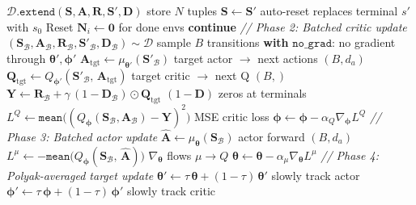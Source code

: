 \documentclass[11pt]{article}
\begin{document}
\begin{algorithm}[p]
\begin{minipage}[t]{0.68\linewidth}
\begin{algorithmic}[1]
    \State $\mathcal{D}.\texttt{extend}(\mathbf{S}, \mathbf{A}, \mathbf{R}, \mathbf{S}', \mathbf{D})$ \hfill store $N$ tuples
    \State $\mathbf{S} \gets \mathbf{S}'$ \hfill auto-reset replaces terminal $s'$ with $s_0$
    \State Reset $\mathbf{N}_i \gets \mathbf{0}$ for done envs
     \textbf{continue} \EndIf
    \Statex \hspace{\algorithmicindent}\textit{// Phase 2: Batched critic update}
    \State $(\mathbf{S}_\mathcal{B}, \mathbf{A}_\mathcal{B}, \mathbf{R}_\mathcal{B}, \mathbf{S}'_\mathcal{B}, \mathbf{D}_\mathcal{B}) \sim \mathcal{D}$ \hfill sample $B$ transitions
    \State \textbf{with} $\texttt{no\_grad}$: \hfill no gradient through $\boldsymbol{\theta}', \boldsymbol{\phi}'$
    \State \hspace{\algorithmicindent} $\mathbf{A}_{\text{tgt}} \gets \mu_{\boldsymbol{\theta}'}(\mathbf{S}'_\mathcal{B})$ \hfill target actor $\to$ next actions $(B, d_a)$
    \State \hspace{\algorithmicindent} $\mathbf{Q}_{\text{tgt}} \gets Q_{\boldsymbol{\phi}'}(\mathbf{S}'_\mathcal{B},\, \mathbf{A}_{\text{tgt}})$ \hfill target critic $\to$ next Q $(B,)$
    \State \hspace{\algorithmicindent} $\mathbf{Y} \gets \mathbf{R}_\mathcal{B} + \gamma\,(1 {-} \mathbf{D}_\mathcal{B}) \odot \mathbf{Q}_{\text{tgt}}$ \hfill $(1{-}\mathbf{D})$ zeros at terminals
    \State $L^Q \gets \texttt{mean}\!\big((Q_{\boldsymbol{\phi}}(\mathbf{S}_\mathcal{B}, \mathbf{A}_\mathcal{B}) - \mathbf{Y})^2\big)$ \hfill MSE critic loss
    \State $\boldsymbol{\phi} \gets \boldsymbol{\phi} - \alpha_Q \nabla_{\boldsymbol{\phi}} L^Q$
    \Statex \hspace{\algorithmicindent}\textit{// Phase 3: Batched actor update}
    \State $\hat{\mathbf{A}} \gets \mu_{\boldsymbol{\theta}}(\mathbf{S}_\mathcal{B})$ \hfill actor forward $(B, d_a)$
    \State $L^\mu \gets -\texttt{mean}\!\big(Q_{\boldsymbol{\phi}}(\mathbf{S}_\mathcal{B},\, \hat{\mathbf{A}})\big)$ \hfill $\nabla_{\boldsymbol{\theta}}$ flows $\mu \to Q$
    \State $\boldsymbol{\theta} \gets \boldsymbol{\theta} - \alpha_\mu \nabla_{\boldsymbol{\theta}} L^\mu$
    \Statex \hspace{\algorithmicindent}\textit{// Phase 4: Polyak-averaged target update}
    \State $\boldsymbol{\theta}' \gets \tau\,\boldsymbol{\theta} + (1 - \tau)\,\boldsymbol{\theta}'$ \hfill slowly track actor
    \State $\boldsymbol{\phi}' \gets \tau\,\boldsymbol{\phi} + (1 - \tau)\,\boldsymbol{\phi}'$ \hfill slowly track critic
\EndFor
\end{algorithmic}
\end{minipage}
\end{algorithm}
\end{document}

